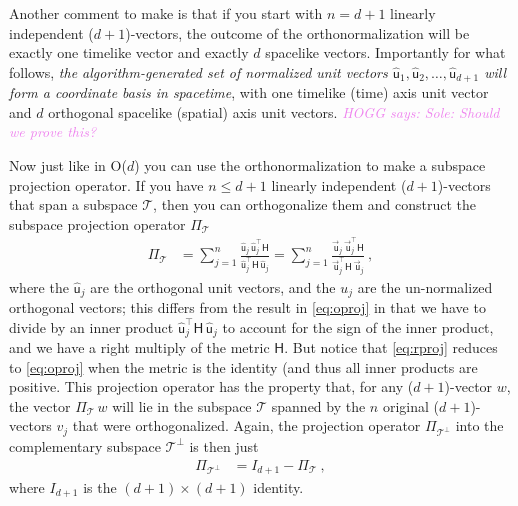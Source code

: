 \documentclass{article}
\newcommand{\metric}{\mathsf{H}}
\newcommand{\proj}{\mathsf{\Pi}}
\newcommand\upvec[1]{\!\vec{\,\mathrm{#1}}}
\newcommand{\Lvec}[1]{\upvec{\mathsf{#1}}} %
\newcommand{\Lhat}[1]{\hat{\mathsf{#1}}} %
\newcommand{\plus}{\!+\!} %
\newcommand{\HOGG}[1]{\textcolor{violet}{\textsl{HOGG says: {#1}}}}
\begin{document}
Another comment to make is that if you start with $n=d+1$ linearly independent ($d\plus1$)-vectors, the outcome of the orthonormalization will be exactly one timelike vector and exactly $d$ spacelike vectors.
Importantly for what follows, \emph{the algorithm-generated set of normalized unit vectors $\Lhat{u}_1,\Lhat{u}_2,\ldots,\Lhat{u}_{d+1}$ will form a coordinate basis in spacetime}, with one timelike (time) axis unit vector and $d$ orthogonal spacelike (spatial) axis unit vectors.
\HOGG{Sole: Should we prove this?}

Now just like in O($d$) you can use the orthonormalization to make a subspace projection operator.
If you have $n\leq d+1$ linearly independent ($d\plus1$)-vectors that span a subspace $\mathscr{T}$, then you can orthogonalize them and construct the subspace projection operator $\proj_\mathscr{T}$
\begin{align}\label{eq:rproj}
    \proj_\mathscr{T} &= \sum_{j=1}^n \frac{\Lhat{u}_j\,\Lhat{u}_j^\top\metric}{\Lhat{u}_j^\top\metric\,\Lhat{u}_j} = \sum_{j=1}^n \frac{\Lvec{u}_j\,\Lvec{u}_j^\top\metric}{\Lvec{u}_j^\top\metric\,\Lvec{u}_j} ~,
\end{align}
where the $\Lhat{u}_j$ are the orthogonal unit vectors, and the $u_j$ are the un-normalized orthogonal vectors; this differs from the result in \eqref{eq:oproj} in that we have to divide by an inner product $\Lhat{u}_j^\top\metric\,\Lhat{u}_j$ to account for the sign of the inner product, and we have a right multiply of the metric $\metric$.
But notice that \eqref{eq:rproj} reduces to \eqref{eq:oproj} when the metric is the identity (and thus all inner products are positive.
This projection operator has the property that, for any ($d\plus1$)-vector $w$, the vector $\proj_\mathscr{T}\,w$ will lie in the subspace $\mathscr{T}$ spanned by the $n$ original ($d\plus1$)-vectors $v_j$ that were orthogonalized.
Again, the projection operator $\proj_{\mathscr{T}^\perp}$ into the complementary subspace $\mathscr{T}^\perp$ is then just
\begin{align}\label{eq:lprojcomp}
    \proj_{\mathscr{T}^\perp} &= I_{d+1} - \proj_\mathscr{T} ~,
\end{align}
where $I_{d+1}$ is the $(d+1)\times(d+1)$ identity.
\end{document}
